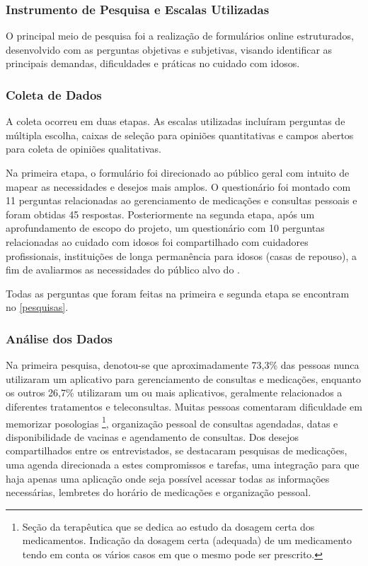 \documentclass[
	article,			%
	12pt,				%
	oneside,			%
	a4paper,			%
    BIBLATEX,           %
	english,			%
	brazil,				%
	sumario=tradicional
	]{abntex2}
\begin{document}
\subsubsection{Instrumento de Pesquisa e Escalas Utilizadas}

O principal meio de pesquisa foi a realização de formulários online estruturados, desenvolvido com as perguntas objetivas e subjetivas, visando identificar as principais demandas, dificuldades e práticas no cuidado com idosos.

\subsubsection{Coleta de Dados}

A coleta ocorreu em duas etapas. As escalas utilizadas incluíram perguntas de múltipla escolha, caixas de seleção para opiniões quantitativas e campos abertos para coleta de opiniões qualitativas. 

Na primeira etapa, o formulário foi direcionado ao público geral com intuito de mapear as necessidades e desejos mais amplos. O questionário foi montado com 11 perguntas relacionadas ao gerenciamento de medicações e consultas pessoais e foram obtidas 45 respostas. Posteriormente na segunda etapa, após um aprofundamento de escopo do projeto, um questionário com 10 perguntas relacionadas ao cuidado com idosos foi compartilhado com cuidadores profissionais, instituições de longa permanência para idosos (casas de repouso), a fim de avaliarmos as necessidades do público alvo do \nomeprojeto. 

Todas as perguntas que foram feitas na primeira e segunda etapa se encontram no \autoref{pesquisas}.

\subsubsection{Análise dos Dados}

Na primeira pesquisa, denotou-se que aproximadamente 73,3\% das pessoas nunca utilizaram um aplicativo para gerenciamento de consultas e medicações, enquanto os outros 26,7\% utilizaram um ou mais aplicativos, geralmente relacionados a diferentes tratamentos e teleconsultas. Muitas pessoas comentaram dificuldade em memorizar posologias
\footnote[1]{Seção da terapêutica que se dedica ao estudo da dosagem certa dos medicamentos. Indicação da dosagem certa (adequada) de um medicamento tendo em conta os vários casos em que o mesmo pode ser prescrito.}, 
organização pessoal de consultas agendadas, datas e disponibilidade de vacinas e agendamento de consultas. Dos desejos compartilhados entre os entrevistados, se destacaram pesquisas de medicações, uma agenda direcionada a estes compromissos e tarefas, uma integração para que haja apenas uma aplicação onde seja possível acessar todas as informações necessárias, lembretes do horário de medicações e organização pessoal.
\end{document}
